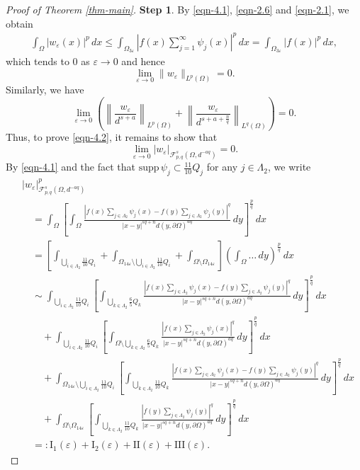 \documentclass[11pt,twoside]{article}
\def\cf{{\mathcal F}}
\def\Qi{\frac{11}{10}Q_i}
\def\Qkk{\frac{6}{5}Q_k}
\def\Qk{\frac{11}{10}Q_k}
\def\blz{\Lambda}
\def\boz{{\Omega}}
\def\vez{\varepsilon}
\def\pa{\partial}                %
\def\we{w_{\varepsilon}}
\def\huae{\varepsilon}
\def\bozfour{\Omega_{14\huae}}
\def\huafwe{{\cf}_{p,q}^s(\boz,d^{-aq})}
\theoremstyle{mylem}
\theoremstyle{definition}
\numberwithin{equation}{section}
\begin{document}
\begin{proof}[Proof of Theorem \ref{thm-main}]
{\bf Step 1}. By \eqref{eqn-4.1}, \eqref{eqn-2.6} and \eqref{eqn-2.1}, we obtain
\begin{align*}
\int_{\boz}| \we(x)|^p\,dx\leq\int_{{\boz}_{3\varepsilon}}\left|f(x)\sum_{j =1}^\infty \psi_j(x)\right|^p\,dx=\int_{{\boz}_{3\varepsilon}}| f(x)|^p\,dx,
\end{align*}
which tends to $0$ as $\varepsilon\to 0$ and hence 
$$
\lim_{\huae \to 0} \| \we \|_{L^p(\Omega)}=0.
$$
Similarly, we have
$$
\lim_{\huae \to 0}\left(\left\|\frac{\we}{d^{s+a}}\right\|_{L^p(\Omega)}
+\left\|\frac{\we}{d^{s+a+\frac{n}{q}}}\right\|_{L^q(\Omega)}\right)=0.
$$
Thus, to prove \eqref{eqn-4.2}, it
remains to show that
\begin{equation}\label{eqn-4.3}
\lim_{\huae \to 0} | \we |_{\huafwe}=0.
\end{equation}
By \eqref{eqn-4.1} and the fact that \( \text{supp}\,\psi_j \subset \frac{11}{10}Q_j \) for any $j\in\Lambda_2$, we write
\begin{align}\label{eqn-4.4}
&|\we|_{\huafwe}^p \nonumber\\
&\quad=\int_{\boz} \left[\int_{\boz} \frac{| f(x)\sum_{j \in \Lambda_2} \psi_j(x) -  f(y)\sum_{j \in \Lambda_2} \psi_j(y)|^q}{|x - y|^{s q + n}d(y,\pa\boz)^{aq}}\,dy \right]^{\frac{p}{q}}\,dx  \nonumber \\
&\quad=\left[ \int_{\bigcup_{i \in \blz_2} \Qi}+ \int_{\bozfour \setminus \bigcup_{i \in \blz_2} \Qi}+ \int_{\boz \setminus \bozfour} \right]\left(\int_{\boz}\dots\,dy\right)^{\frac{p}{q}}\,dx \nonumber \\
&\quad\sim\int_{\bigcup_{i \in \blz_2} \Qi} \left[ \int_{\bigcup_{k \in \blz_2} \Qkk} \frac{| f(x)\sum_{j \in \Lambda_2} \psi_j(x) -  f(y)\sum_{j \in \Lambda_2} \psi_j(y)|^q}{|x - y|^{s q + n} {d(y,\pa\boz)^{aq}}}\,dy \right]^{\frac{p}{q}}\,dx \nonumber  \\
&\qquad+  \int_{\bigcup_{i \in \blz_2} \Qi} \left[ \int_{\boz \setminus \bigcup_{k \in \blz_2} \Qkk} \frac{| f(x)\sum_{j \in \Lambda_2} \psi_j(x) |^q}{|x - y|^{s q + n}{d(y,\pa\boz)^{aq}}}\,dy \right]^{\frac{p}{q}}\,dx  \nonumber \\
&\qquad+ \int_{\bozfour \setminus \bigcup_{i \in \blz_2} \Qi} \left[ \int_{\bigcup_{k \in \blz_2} \Qk} \frac{| f(x)\sum_{j \in \Lambda_2} \psi_j(x) -  f(y)\sum_{j \in \Lambda_2} \psi_j(y)|^q}{|x - y|^{s q + n}{d(y,\pa\boz)^{aq}}}\,dy \right]^{\frac{p}{q}}\,dx  \nonumber \\
&\qquad+ \int_{\boz \setminus \bozfour} \left[ \int_{\bigcup_{k \in \blz_2} \Qk} \frac{| f(y)\sum_{j \in \Lambda_2} \psi_j(y) |^q}{|x - y|^{s q + n}d(y,\pa\boz)^{aq}}\,dy \right]^{\frac{p}{q}}\,dx  \nonumber \\
&\quad=:\mathrm{I}_1(\vez)+\mathrm{I}_2(\vez)+\mathrm{II}(\vez)+\mathrm{III}(\vez).
\end{align}


\end{proof}
\end{document}

